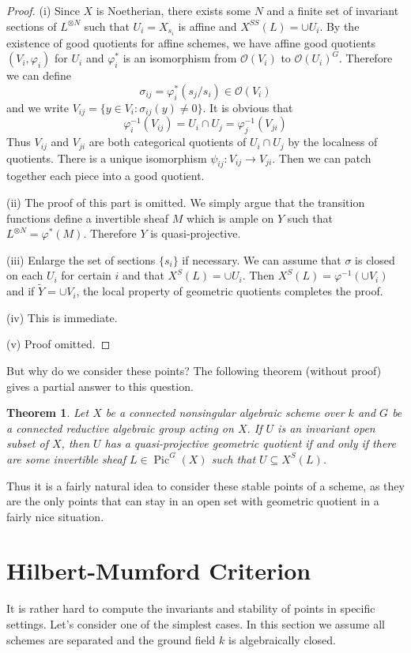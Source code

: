 \documentclass[12pt]{article}
\newtheorem{theorem}{Theorem}[section]
\theoremstyle{remark}
\theoremstyle{definition}
\newcommand{\s}[0]{\sigma}
\newcommand{\Pic}[0]{\operatorname{Pic}}
\begin{document}
    \begin{proof}
        (i) Since $X$ is Noetherian, there exists some $N$ and a finite set of invariant sections of $L^{\otimes N}$ such that $U_i=X_{s_i}$ is affine and $X^{SS}(L)=\cup U_i$. By the existence of good quotients for affine schemes, we have affine good quotients $(V_i,\varphi_i)$ for $U_i$ and $\varphi_i^*$ is an isomorphism from $\mathcal O(V_i)$ to $\mathcal O(U_i)^G$. Therefore we can define
        \[\s_{ij}=\varphi_i^*(s_j/s_i)\in\mathcal O(V_i)\]
        and we write $V_{ij}=\{y\in V_i:\s_{ij}(y)\neq 0\}$. It is obvious that
        \[\varphi_i^{-1}(V_{ij})=U_i\cap U_j=\varphi_j^{-1}(V_{ji})\]
        Thus $V_{ij}$ and $V_{ji}$ are both categorical quotients of $U_i\cap U_j$ by the localness of quotients. There is a unique isomorphism $\psi_{ij}:V_{ij}\to V_{ji}$. Then we can patch together each piece into a good quotient.

        (ii) The proof of this part is omitted. We simply argue that the transition functions define a invertible sheaf $M$ which is ample on $Y$ such that $L^{\otimes N}=\varphi^*(M)$. Therefore $Y$ is quasi-projective.

        (iii) Enlarge the set of sections $\{s_i\}$ if necessary. We can assume that $\s$ is closed on each $U_i$ for certain $i$ and that $X^S(L)=\cup U_i$. Then $X^S(L)=\varphi^{-1}(\cup V_i)$ and if $\tilde Y=\cup V_i$, the local property of geometric quotients completes the proof.

        (iv) This is immediate.
        
        (v) Proof omitted.
    \end{proof}
    But why do we consider these points? The following theorem (without proof) gives a partial answer to this question.
    \begin{theorem}
        Let $X$ be a connected nonsingular algebraic scheme over $k$ and $G$ be a connected reductive algebraic group acting on $X$. If $U$ is an invariant open subset of $X$, then $U$ has a quasi-projective geometric quotient if and only if there are some invertible sheaf $L\in\Pic^G(X)$ such that $U\subseteq X^S(L)$. 
    \end{theorem}
    Thus it is a fairly natural idea to consider these stable points of a scheme, as they are the only points that can stay in an open set with geometric quotient in a fairly nice situation.
    \section{Hilbert-Mumford Criterion}
    It is rather hard to compute the invariants and stability of points in specific settings. Let's consider one of the simplest cases. In this section we assume all schemes are separated and the ground field $k$ is algebraically closed.
\end{document}

